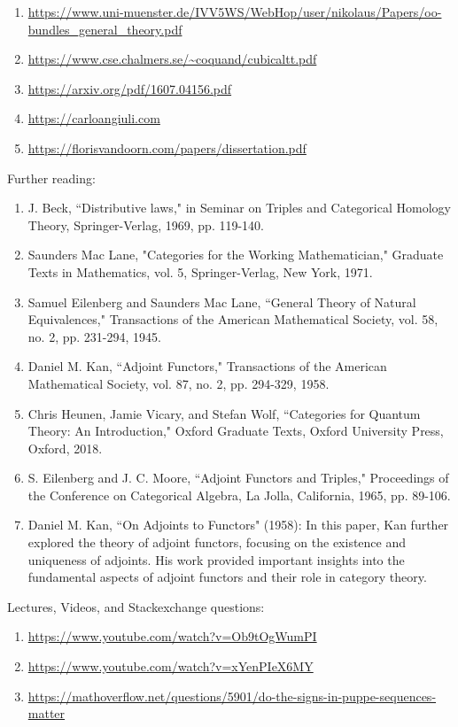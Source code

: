 \documentclass{book}
\theoremstyle{definition}
\begin{document}
{\begin{enumerate}
\item \url{https://www.uni-muenster.de/IVV5WS/WebHop/user/nikolaus/Papers/oo-bundles_general_theory.pdf}
\item \url{https://www.cse.chalmers.se/~coquand/cubicaltt.pdf}
\item \url{https://arxiv.org/pdf/1607.04156.pdf}
\item \url{https://carloangiuli.com}
\item \url{https://florisvandoorn.com/papers/dissertation.pdf}
\end{enumerate}
\fi

Further reading:

\begin{enumerate}
\item J. Beck, ``Distributive laws," in Seminar on Triples and Categorical Homology Theory, Springer-Verlag, 1969, pp. 119-140.
\item Saunders Mac Lane, "Categories for the Working Mathematician," Graduate Texts in Mathematics, vol. 5, Springer-Verlag, New York, 1971.
\item Samuel Eilenberg and Saunders Mac Lane, ``General Theory of Natural Equivalences," Transactions of the American Mathematical Society, vol. 58, no. 2, pp. 231-294, 1945.
\item Daniel M. Kan, ``Adjoint Functors," Transactions of the American Mathematical Society, vol. 87, no. 2, pp. 294-329, 1958.
\item Chris Heunen, Jamie Vicary, and Stefan Wolf, ``Categories for Quantum Theory: An Introduction," Oxford Graduate Texts, Oxford University Press, Oxford, 2018.
\item S. Eilenberg and J. C. Moore, ``Adjoint Functors and Triples," Proceedings of the Conference on Categorical Algebra, La Jolla, California, 1965, pp. 89-106.
\item Daniel M. Kan, ``On Adjoints to Functors" (1958): In this paper, Kan further explored the theory of adjoint functors, focusing on the existence and uniqueness of adjoints. His work provided important insights into the fundamental aspects of adjoint functors and their role in category theory.
\end{enumerate}

Lectures, Videos, and Stackexchange questions:

\begin{enumerate}
\item \url{https://www.youtube.com/watch?v=Ob9tOgWumPI}
\item \url{https://www.youtube.com/watch?v=xYenPIeX6MY}
\item \url{https://mathoverflow.net/questions/5901/do-the-signs-in-puppe-sequences-matter}
\end{enumerate}

}
\end{document}
